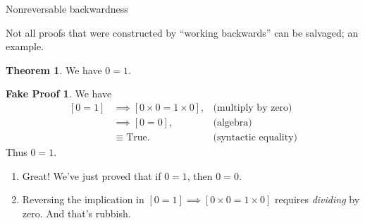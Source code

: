 \documentclass[fleqn]{beamer}
\theoremstyle{definition}
\newtheorem{myth}{Theorem}
\newtheorem{myfakeproof}{Fake Proof}
\begin{document}
\begin{frame}{Nonreversable backwardness}

  Not all proofs that were constructed by ``working backwards''
  can be salvaged; an example.

  \begin{myth} We have $0 = 1$. \end{myth}

  \begin{myfakeproof}
   We have
   \begin{align*}
    \left[0 = 1\right] &\implies \left[0 \times 0 = 1 \times 0 \right], & \mbox{(multiply by zero)} \\
                       &\implies [0 = 0],   &\mbox{(algebra)} \\
                       &\equiv \mbox{True}.  &\mbox{(syntactic equality)}
   \end{align*}
    Thus $0 = 1$.
  \end{myfakeproof}

  \begin{enumerate}
    \item Great! We've just proved that if $0 = 1$, then $0=0$. 

    \item Reversing the implication in $\left[0 = 1\right] \implies \left[0 \times 0 = 1 \times 0 \right]$
    requires \emph{dividing} by zero. And that's rubbish.
  \end{enumerate}
    





 
\end{frame}
\end{document}
